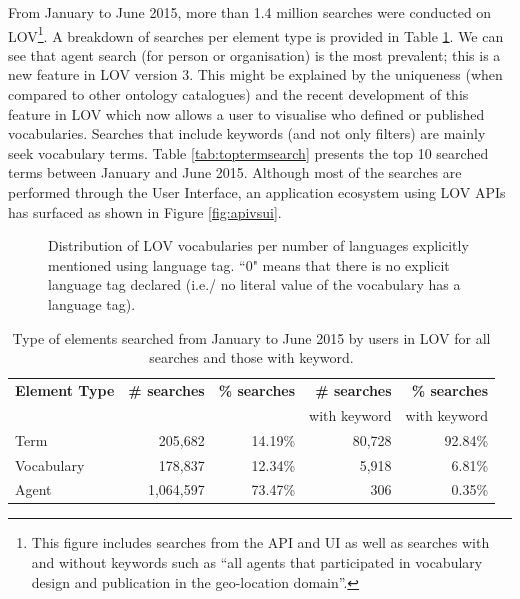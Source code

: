 \documentclass{iosart2c}
\begin{document}
From January to June 2015, more than 1.4 million searches were conducted on LOV\footnote{This figure includes searches from the API and UI as well as searches with and without keywords such as ``all agents that participated in vocabulary design and publication in the geo-location domain''.}. A breakdown of searches per element type is provided in Table \ref{tab:searchcategory}. We can see that agent search (for person or organisation) is the most prevalent; this is a new feature in LOV version 3. This might be explained by the uniqueness (when compared to other ontology catalogues) and the recent development of this feature in LOV which now allows a user to visualise who defined or published vocabularies. Searches that include keywords (and not only filters) are mainly seek vocabulary terms. Table \ref{tab:toptermsearch} presents the top 10 searched terms between January and June 2015. Although most of the searches are performed through the User Interface, an application ecosystem using LOV APIs has surfaced as shown in Figure \ref{fig:apivsui}. 

\begin{figure}[htb]
\resizebox{\linewidth}{!}{}
\caption{\label{fig:langdist} Distribution of LOV vocabularies per number of languages explicitly mentioned using language tag. ``0" means that there is no explicit language tag declared (i.e./ no literal value of the vocabulary has a language tag).}
\end{figure}


\begin{table}[h!tb]
\caption{Type of elements searched from January to June 2015 by users in LOV for all searches and those with keyword.}
\begin{tabular}{l|rr|rr}
\hline
\textbf{Element Type } & \textbf{\# searches} & \textbf{\% searches} & \textbf{\# searches} & \textbf{\% searches} \\
 &  & & with keyword & with keyword \\ \hline
Term & 205,682 & 14.19\% & 80,728 & 92.84\% \\
Vocabulary & 178,837 & 12.34\% & 5,918 & 6.81\% \\
Agent & 1,064,597 & 73.47\% & 306 & 0.35\% \\
\hline  
\end{tabular}
\label{tab:searchcategory}
\end{table}
\end{document}
